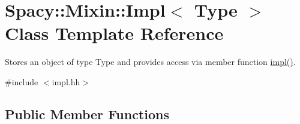 \hypertarget{classSpacy_1_1Mixin_1_1Impl}{}\section{Spacy\+:\+:Mixin\+:\+:Impl$<$ Type $>$ Class Template Reference}
\label{classSpacy_1_1Mixin_1_1Impl}


Stores an object of type Type and provides access via member function \hyperlink{classSpacy_1_1Mixin_1_1Impl_a5e61399bae41338a87e701b24b13f52a}{impl()}.  




{\ttfamily \#include $<$impl.\+hh$>$}

\subsection*{Public Member Functions}
